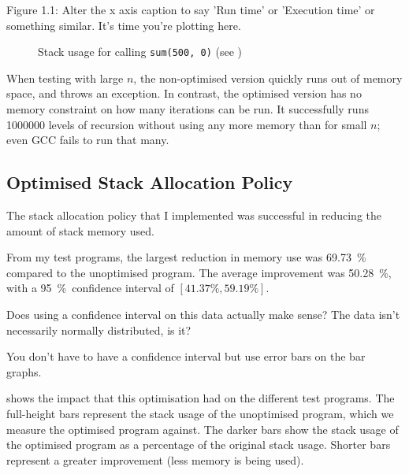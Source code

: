 \documentclass[00-main.tex]{subfiles}
\begin{document}
\begin{Comment}
Figure 1.1:  Alter the x axis caption to say 'Run time' or 'Execution
time' or something similar.  It's time you're plotting here.
\end{Comment}

\begin{figure}[ht]
  \centering
  \caption{Stack usage for calling \texttt{sum(500, 0)} (see )}
  \label{fig:plot:tail-call optimisation stack use}
\end{figure}

When testing with large $n$, the non-optimised version quickly runs out of memory space, and throws an exception.
In contrast, the optimised version has no memory constraint on how many iterations can be run.
It successfully runs \num{1000000} levels of recursion without using any more memory than for small $n$; even GCC fails to run that many.


\subsection{Optimised Stack Allocation Policy}

The stack allocation policy that I implemented was successful in reducing the amount of stack memory used.

From my test programs, the largest reduction in memory use was \SI{69.73}{\percent} compared to the unoptimised program.
The average improvement was \SI{50.28}{\percent}, with a \SI{95}{\percent}~confidence interval of $[41.37\%, 59.19\%]$.

\begin{Comment}
Does using a confidence interval on this data actually make sense? The data isn't necessarily normally distributed, is it?
\end{Comment}

\begin{Comment}
You don't have to have a confidence interval but use error bars on the
bar graphs.
\end{Comment}

 shows the impact that this optimisation had on the different test programs.
The full-height bars represent the stack usage of the unoptimised program, which we measure the optimised program against.
The darker bars show the stack usage of the optimised program as a percentage of the original stack usage.
Shorter bars represent a greater improvement (less memory is being used).
\end{document}
